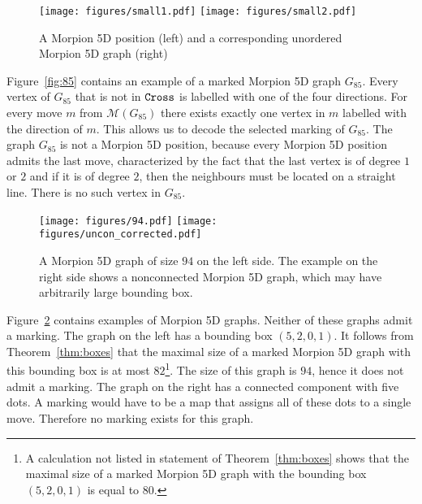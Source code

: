 \begin{figure}
    \texttt{[image: figures/small1.pdf]}
    \texttt{[image: figures/small2.pdf]}
    \caption{\label{fig:small}
      A Morpion 5D position (left) and a corresponding unordered Morpion 5D graph (right)
    }
\end{figure}
 
\begin{example}
Figure~\ref{fig:85} contains an example of a marked Morpion 5D graph $G_{85}$. 
Every vertex of $G_{85}$ that is not in $\texttt{Cross}$ is labelled with one of the four directions. 
For every move $m$ from $\mathcal{M}(G_{85})$ there exists exactly one vertex in $m$ 
  labelled with the direction of $m$.
This allows us to decode the selected marking of $G_{85}$.
The graph $G_{85}$ is not a Morpion 5D position,  because every Morpion 5D position admits the last move, characterized by the fact that the last vertex is of degree $1$ or $2$ and if it is
of degree $2$, then the neighbours must be located on a straight line. 
There is no such vertex in $G_{85}$.
\end{example}

\begin{figure}
  \centering
    \texttt{[image: figures/94.pdf]}
    \texttt{[image: figures/uncon\_corrected.pdf]}
  \caption{
    A Morpion 5D graph of size $94$ on the left side. 
    The example on the right side shows a nonconnected Morpion 5D graph,
      which may have arbitrarily large bounding box.
  }
  \label{fig:uncon}
\end{figure}

\begin{example}
Figure~\ref{fig:uncon} contains examples of Morpion 5D graphs.
Neither of these graphs admit a marking.
The graph on the left has a bounding box $(5,2,0,1)$.
It follows from Theorem~\ref{thm:boxes} that the maximal size of a marked Morpion 5D graph with this 
  bounding box is at most $82$\footnote{A calculation not listed in statement of Theorem~\ref{thm:boxes} shows that the maximal size of a marked Morpion 5D graph
with the bounding box $(5,2,0,1)$ is equal to $80$.}.
The size of this graph is $94$, hence it does not admit a marking.
The graph on the right has a connected component with five dots.
A marking would have to be a map that assigns all of these dots to a single move.
Therefore no marking exists for this graph.
\end{example}


